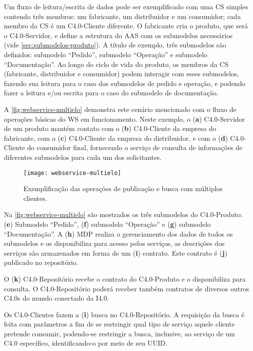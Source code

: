 Um fluxo de leitura/escrita de dados pode ser exemplificado com uma CS simples contendo três membros: um fabricante, um distribuidor e um consumidor; cada membro da CS é um C4.0-Cliente diferente. O fabricante cria o produto, que será o C4.0-Servidor, e define a estrutura do AAS com os submodelos necessários (vide \autoref{sec:submodelos-produto}). A título de exemplo, três submodelos são definidos: submodelo ``Pedido'', submodelo ``Operação'' e submodelo ``Documentação''. Ao longo do ciclo de vida do produto, os membros da CS (fabricante, distribuidor e consumidor) podem interagir com esses submodelos, fazendo sua leitura para o caso dos submodelos de pedido e operação, e podendo fazer a leitura e/ou escrita para o caso do submodelo de documentação.

A \autoref{fig:webservice-multielo} demonstra este cenário mencionado com o fluxo de operações básicas do WS em funcionamento. Neste exemplo, o (\textbf{a}) C4.0-Servidor de um produto mantém contato com o (\textbf{b}) C4.0-Cliente da empresa do fabricante, com o (\textbf{c}) C4.0-Cliente da empresa do distribuidor, e com o (\textbf{d}) C4.0-Cliente do consumidor final, fornecendo o serviço de consulta de informações de diferentes submodelos para cada um dos solicitantes.

\begin{figure}[htb]
	\centering
	\texttt{[image: webservice-multielo]}
	\caption{Exemplificação das operações de publicação e busca com múltiplos clientes.}
	\label{fig:webservice-multielo}
\end{figure}

Na \autoref{fig:webservice-multielo} são mostrados os três submodelos do C4.0-Produto: (\textbf{e}) Submodelo ``Pedido'', (\textbf{f}) submodelo ``Operação'' e (\textbf{g}) submodelo ``Documentação''. A (\textbf{h}) MDP realiza o gerenciamento dos dados de todos os submodelos e os disponibiliza para acesso pelos serviços, as descrições dos serviços são armazenados em forma de um (\textbf{i}) contrato. Este contrato é (\textbf{j}) publicado no repositório.

O (\textbf{k}) C4.0-Repositório recebe o contrato do C4.0-Produto e o disponibiliza para consulta. O C4.0-Repositório poderá receber também contratos de diversos outros C4.0s do mundo conectado da I4.0.

Os C4.0-Clientes fazem a (\textbf{l}) busca no C4.0-Repositório. A requisição da busca é feita com parâmetros a fim de se restringir qual tipo de serviço aquele cliente pretende consumir, podendo-se restringir a busca, inclusive, ao serviço de um C4.0 específico, identificando-o por meio de seu UUID.

